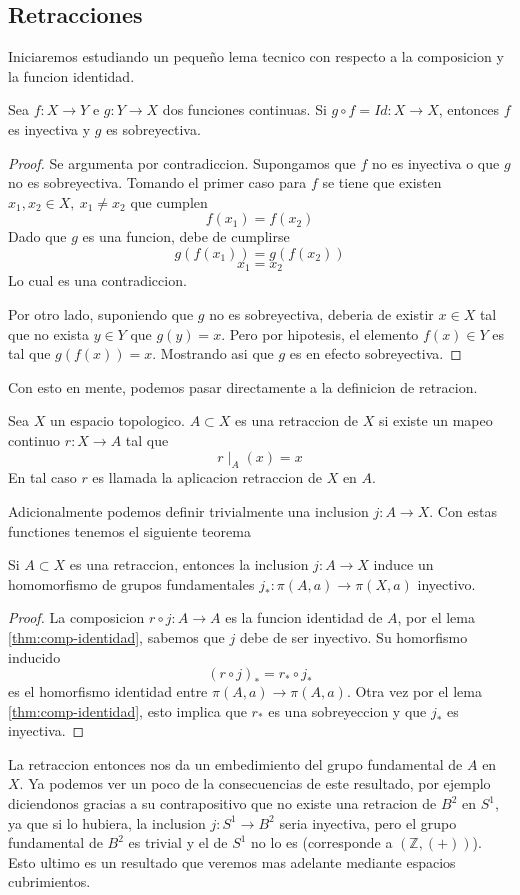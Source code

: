 \subsection*{Retracciones}
Iniciaremos estudiando un pequeño lema tecnico con respecto a la
composicion y la funcion identidad.
\begin{lema} \label{thm:comp-identidad}
  Sea \(f : X \to Y\) e \(g : Y \to X\) dos funciones continuas. Si \( g
  \circ f = Id : X \to X \), entonces \(f\) es inyectiva y \(g\) es
  sobreyectiva.
\end{lema}
\begin{proof}
  Se argumenta por contradiccion. Supongamos que \(f\) no es inyectiva o
  que \(g\) no es sobreyectiva. Tomando el primer caso para \(f\) se
  tiene que existen \(x_1 , x_2 \in X,\ x_1 \neq x_2\) que cumplen
  \[ f (x_1) = f(x_2) \]
  Dado que \(g\) es una funcion, debe de cumplirse
  \[ g (f (x_1)) = g (f(x_2)) \]
  \[ x_1 = x_2 \]
  Lo cual es una contradiccion.

  Por otro lado, suponiendo que \(g\) no es sobreyectiva, deberia de
  existir \(x \in X\) tal que no exista \( y \in Y\) que \(g (y) = x\).
  Pero por hipotesis, el elemento \(f(x) \in Y\) es tal que \(g (f (x))
  = x\). Mostrando asi que \(g\) es en efecto sobreyectiva.
\end{proof}
Con esto en mente, podemos pasar directamente a la definicion de retracion.
\begin{definicion}
  Sea \(X\) un espacio topologico. \(A \subset X\) es una retraccion de
  \(X\) si existe un mapeo continuo \(r : X \to A\) tal que
  \[ r \mid_{A} (x) = x \]
  En tal caso \(r\) es llamada la aplicacion retraccion de \(X\) en \(A\).
\end{definicion}
Adicionalmente podemos definir trivialmente una inclusion \(j : A \to
X\). Con estas functiones tenemos el siguiente teorema
\begin{teorema}
Si \(A \subset X\) es una retraccion, entonces la inclusion \(j : A \to
X\) induce un homomorfismo de grupos fundamentales \(j_{*} : \pi(A, a)
\to \pi(X,a)\) inyectivo.
\end{teorema}
\begin{proof}
  La composicion \(r \circ j : A \to A\) es la funcion identidad de
  \(A\), por el lema \ref{thm:comp-identidad}, sabemos que \(j\) debe de
  ser inyectivo. Su homorfismo inducido
  \[ (r \circ j)_{*} = r_{*} \circ j_{*} \]
  es el homorfismo identidad entre \(\pi(A,a) \to \pi(A,a)\). Otra vez
  por el lema \ref{thm:comp-identidad}, esto implica que \(r_{*}\) es una
  sobreyeccion y que \(j_{*}\) es inyectiva.
\end{proof}
La retraccion entonces nos da un embedimiento del grupo fundamental de
\( A \) en \(X\). Ya podemos ver un poco de la consecuencias de este
resultado, por ejemplo diciendonos gracias a su contrapositivo que no
existe una retracion de \(B^2\) en \(S^1\), ya que si lo hubiera, la
inclusion \(j : S^1 \to B^2\) seria inyectiva, pero el grupo fundamental
de \(B^2\) es trivial y el de \(S^1\) no lo es (corresponde a \((\mathbb
Z, (+))\)). Esto ultimo es un resultado que veremos mas adelante mediante
espacios cubrimientos.

